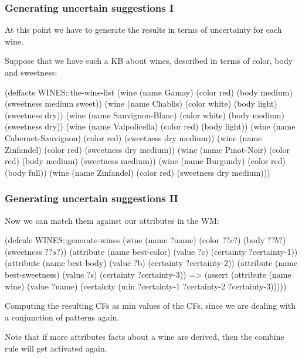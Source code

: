 \documentclass[xcolor={usenames,dvipsnames,svgnames}, compress]{beamer}
\begin{document}
\begin{frame}[fragile]
  \frametitle{Generating uncertain suggestions I}
  At this point we have to generate the results in terms of
  uncertainty for each wine.\par
  Suppose that we have such a KB about wines, described in terms of
  \textsf{color}, \textsf{body} and \textsf{sweetness}:
  \begin{clips-code}[numbers=none]
    (deffacts WINES::the-wine-list 
        (wine (name Gamay) (color red) (body medium) 
              (sweetness medium sweet))
        (wine (name Chablis) (color white) (body light) (sweetness dry))
        (wine (name Sauvignon-Blanc) (color white) (body medium)
              (sweetness dry))
        (wine (name Valpolicella) (color red) (body light))
        (wine (name Cabernet-Sauvignon) (color red)
              (sweetness dry medium))
        (wine (name Zinfandel) (color red) (sweetness dry medium))
        (wine (name Pinot-Noir) (color red) (body medium)
              (sweetness medium))
        (wine (name Burgundy) (color red) (body full))
        (wine (name Zinfandel) (color red) (sweetness dry medium)))
  \end{clips-code}
\end{frame}

\begin{frame}[fragile]
  \frametitle{Generating uncertain suggestions II}
  Now we can match them against our attributes in the WM:
  \begin{clips-code}[numbers=none]
    (defrule WINES::generate-wines
        (wine (name ?name)
              (color $? ?c $?)
              (body $? ?b $?)
              (sweetness $? ?s $?))
        (attribute (name best-color) (value ?c) (certainty ?certainty-1))
        (attribute (name best-body) (value ?b) (certainty ?certainty-2))
        (attribute (name best-sweetness) (value ?s) (certainty ?certainty-3))
        =>
        (assert (attribute (name wine) (value ?name)
                           (certainty (min ?certainty-1 
                                           ?certainty-2 
                                           ?certainty-3)))))
  \end{clips-code}
  Computing the resulting CFs as min values of the CFs, since we are
  dealing with a conjunction of patterns again.\par\bigskip

  Note that if more attributes facts about a wine are derived, then
  the combine rule will get activated again.
\end{frame}
\end{document}
